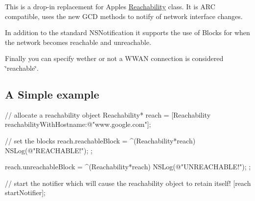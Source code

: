 This is a drop-\/in replacement for Apples \mbox{\hyperlink{interface_reachability}{Reachability}} class. It is A\+RC compatible, uses the new G\+CD methods to notify of network interface changes.

In addition to the standard N\+S\+Notification it supports the use of Blocks for when the network becomes reachable and unreachable.

Finally you can specify wether or not a W\+W\+AN connection is considered \char`\"{}reachable\char`\"{}.

\subsection*{A Simple example}

\begin{DoxyVerb}// allocate a reachability object
Reachability* reach = [Reachability reachabilityWithHostname:@"www.google.com"];

// set the blocks 
reach.reachableBlock = ^(Reachability*reach)
{
    NSLog(@"REACHABLE!");
};

reach.unreachableBlock = ^(Reachability*reach)
{
    NSLog(@"UNREACHABLE!");
};

// start the notifier which will cause the reachability object to retain itself!
[reach startNotifier];\end{DoxyVerb}
 